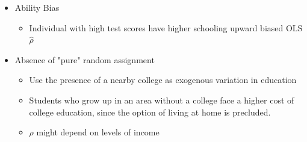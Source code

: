 \documentclass[pdftex]{beamer}
\begin{document}

 
 \begin{frame}
 \begin{itemize}

\item Ability Bias
      \begin{itemize}
      \item Individual with high test scores have higher schooling upward biased OLS $\hat{\rho}$
      \end{itemize}

\item Absence of "pure" random assignment
     \begin{itemize}
      \item Use the presence of a nearby college as exogenous variation in education
      \item Students who grow up in an area without a college face a higher cost of college education, since the option of living at home is precluded.
      \end{itemize}
            \begin{itemize}
      \item  ${\rho}$ might depend on levels of income
      \end{itemize}
\end{itemize}
\end{frame}
\end{document}
